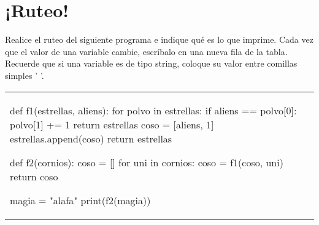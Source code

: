 \section{¡Ruteo!}

Realice el ruteo del siguiente programa e indique qué es lo que imprime. Cada vez que el valor de una variable cambie, escríbalo en una nueva fila de la tabla. Recuerde que si una variable es de tipo string, coloque su valor entre comillas simples ' '.

\begin{tabular}{l c}
\begin{tabularlstlisting}
def f1(estrellas, aliens):
  for polvo in estrellas:
    if aliens == polvo[0]:
      polvo[1] += 1
      return estrellas
  coso = [aliens, 1]
  estrellas.append(coso)
  return estrellas

def f2(cornios):
  coso = []
  for uni in cornios:
    coso = f1(coso, uni)
  return coso

magia = "alafa"
print(f2(magia))


\end{tabularlstlisting}
\end{tabular}
